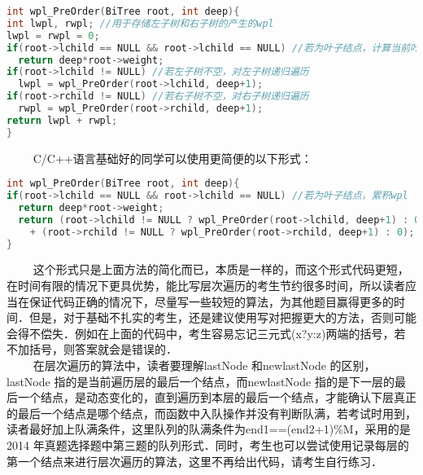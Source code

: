 \begin{lstlisting}[language=cpp]
int wpl_PreOrder(BiTree root, int deep){
int lwpl, rwpl; //用于存储左子树和右子树的产生的wpl
lwpl = rwpl = 0;
if(root->lchild == NULL && root->lchild == NULL) //若为叶子结点，计算当前叶子结点的wpl
  return deep*root->weight;
if(root->lchild != NULL) //若左子树不空，对左子树递归遍历
  lwpl = wpl_PreOrder(root->lchild, deep+1);
if(root->rchild != NULL) //若右子树不空，对右子树递归遍历
  rwpl = wpl_PreOrder(root->rchild, deep+1);
return lwpl + rwpl;
}
\end{lstlisting}
$\qquad$ C/C++语言基础好的同学可以使用更简便的以下形式：
\begin{lstlisting}[language=cpp]
int wpl_PreOrder(BiTree root, int deep){
if(root->lchild == NULL && root->lchild == NULL) //若为叶子结点，累积wpl
  return deep*root->weight;
  return (root->lchild != NULL ? wpl_PreOrder(root->lchild, deep+1) : 0)
    + (root->rchild != NULL ? wpl_PreOrder(root->rchild, deep+1) : 0);
}
\end{lstlisting}
$\qquad$ 这个形式只是上面方法的简化而已，本质是一样的，而这个形式代码更短，在时间有限的情况下更具优势，能比写层次遍历的考生节约很多时间，所以读者应当在保证代码正确的情况下，尽量写一些较短的算法，为其他题目赢得更多的时间．但是，对于基础不扎实的考生，还是建议使用写对把握更大的方法，否则可能会得不偿失．例如在上面的代码中，考生容易忘记三元式(x?y:z)两端的括号，若不加括号，则答案就会是错误的． \\
$\qquad$ 在层次遍历的算法中，读者要理解lastNode 和newlastNode 的区别，lastNode 指的是当前遍历层的最后一个结点，而newlastNode 指的是下一层的最后一个结点，是动态变化的，直到遍历到本层的最后一个结点，才能确认下层真正的最后一个结点是哪个结点，而函数中入队操作并没有判断队满，若考试时用到，读者最好加上队满条件，这里队列的队满条件为end1==(end2+1)\%M，采用的是2014 年真题选择题中第三题的队列形式．同时，考生也可以尝试使用记录每层的第一个结点来进行层次遍历的算法，这里不再给出代码，请考生自行练习．